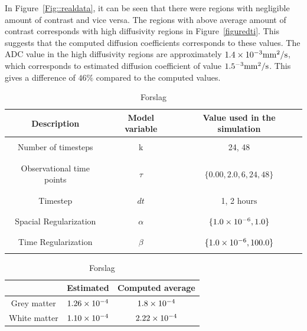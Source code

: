 \documentclass[12pt,a4paper]{article}
\begin{document}
In Figure~\ref{Fig::realdata}, it can be seen that there were regions with negligible amount of contrast and vice versa. The regions with above average amount of contrast corresponds with high diffusivity regions in Figure~\ref{figuredti}. This suggests that the computed diffusion coefficients corresponds to these values. The ADC value in the high diffusivity regions are approximately  $1.4\times 10\sp{-3} \mathrm{mm\sp{2}/s}$, which corresponds to estimated diffusion coefficient of value $1.5\time 10\sp{-3} \mathrm{mm\sp{2}/s}$. This gives a difference of $ 46 \%$ compared to the computed values.



\begin{table}\centering
\begin{tabular}{|ccc|}
\hline
Description & Model variable  & Value used in the simulation\\
\hline
& & \\
Number of timesteps &  k	 & 24, 48	\\
& & \\
\hline
& & \\
Observational time points  & $\tau$ &  $\lbrace 0.00,2.0, 6 , 24, 48 \rbrace$	 \\
& & \\
\hline
& & \\
Timestep & $dt$	 	   &	  1, 2 $\mathrm{hours}$	\\ 
& & \\
\hline
& & \\
Spacial Regularization & $\alpha$	   &	  $\lbrace 1.0\times10\sp{-6}, 1.0\rbrace$\\ 
& & \\
\hline
& & \\
Time Regularization   & $\beta$	   &	 $\lbrace 1.0\times10\sp{-6}, 100.0\rbrace$	\\ 
& & \\
\hline
\end{tabular}
\caption{Forslag}
\label{model-params-overview}
\end{table}


\begin{table}\centering
\begin{tabular}{|ccc|}
\hline
   & Estimated & Computed average\\
\hline
Grey matter  & $ 1.26\times 10\sp{-4}$   &  $1.8\times 10\sp{-4}$  \\
White matter & $ 1.10\times 10\sp{-4}$   &  $2.22\times 10\sp{-4}$  \\
\hline
\end{tabular}
\caption{Forslag}
\label{Tablesummerized}
\end{table}
\end{document}
